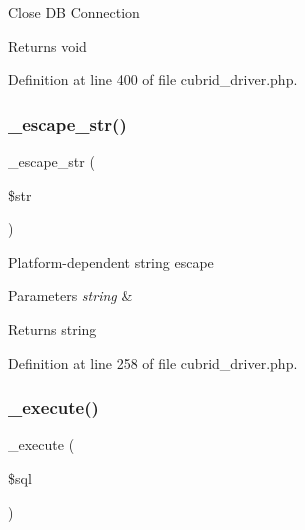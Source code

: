 Close DB Connection

\begin{DoxyReturn}{Returns}
void 
\end{DoxyReturn}


Definition at line 400 of file cubrid\+\_\+driver.\+php.

\mbox{\label{class_c_i___d_b__cubrid__driver_af8ef0237bfcdb19215b63fff769e7a55}} 
\subsubsection{\texorpdfstring{\_escape\_str()}{\_escape\_str()}}
{\footnotesize\ttfamily \+\_\+escape\+\_\+str (\begin{DoxyParamCaption}\item[{}]{\$str }\end{DoxyParamCaption})\hspace{0.3cm}{\ttfamily [protected]}}

Platform-\/dependent string escape


\begin{DoxyParams}{Parameters}
{\em string} & \\
\hline
\end{DoxyParams}
\begin{DoxyReturn}{Returns}
string 
\end{DoxyReturn}


Definition at line 258 of file cubrid\+\_\+driver.\+php.

\mbox{\label{class_c_i___d_b__cubrid__driver_a114ab675d89bf8324a41785fb475e86d}} 
\subsubsection{\texorpdfstring{\_execute()}{\_execute()}}
{\footnotesize\ttfamily \+\_\+execute (\begin{DoxyParamCaption}\item[{}]{\$sql }\end{DoxyParamCaption})\hspace{0.3cm}{\ttfamily [protected]}}

